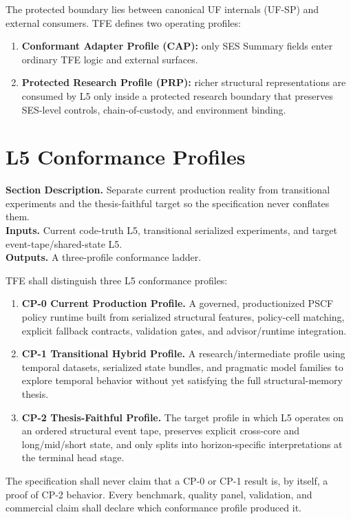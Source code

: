 \documentclass[11pt]{report}
\newcommand{\meta}[3]{\textbf{Section Description.} #1\\
\textbf{Inputs.} #2\\
\textbf{Outputs.} #3\par}
\begin{document}
The protected boundary lies between canonical UF internals (UF-SP) and external consumers. TFE defines two operating profiles:
\begin{enumerate}[leftmargin=1.2cm]
    \item \textbf{Conformant Adapter Profile (CAP):} only SES Summary fields enter ordinary TFE logic and external surfaces.
    \item \textbf{Protected Research Profile (PRP):} richer structural representations are consumed by L5 only inside a protected research boundary that preserves SES-level controls, chain-of-custody, and environment binding.
\end{enumerate}



\section{L5 Conformance Profiles}
\meta{Separate current production reality from transitional experiments and the thesis-faithful target so the specification never conflates them.}{Current code-truth L5, transitional serialized experiments, and target event-tape/shared-state L5.}{A three-profile conformance ladder.}

TFE shall distinguish three L5 conformance profiles:
\begin{enumerate}[leftmargin=1.2cm]
    \item \textbf{CP-0 Current Production Profile.} A governed, productionized PSCF policy runtime built from serialized structural features, policy-cell matching, explicit fallback contracts, validation gates, and advisor/runtime integration.
    \item \textbf{CP-1 Transitional Hybrid Profile.} A research/intermediate profile using temporal datasets, serialized state bundles, and pragmatic model families to explore temporal behavior without yet satisfying the full structural-memory thesis.
    \item \textbf{CP-2 Thesis-Faithful Profile.} The target profile in which L5 operates on an ordered structural event tape, preserves explicit cross-core and long/mid/short state, and only splits into horizon-specific interpretations at the terminal head stage.
\end{enumerate}

The specification shall never claim that a CP-0 or CP-1 result is, by itself, a proof of CP-2 behavior. Every benchmark, quality panel, validation, and commercial claim shall declare which conformance profile produced it.
\end{document}
